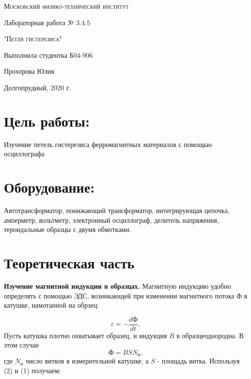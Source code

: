 \documentclass[12pt,a4paper]{article}
\begin{document}
\begin{titlepage}
	\centering
	\vspace{5cm}
	{\scshape\LARGE Московский физико-технический институт \par}
	\vspace{5cm}

	{\huge Лабораторная работа № 3.4.5 \par}
	\vspace{1cm}
	{\scshape\Large "Петля гистерезиса"\par}
	\vspace{2cm}
	\vfill
\begin{flushright}
	{\Large Выполнила студентка Б04-906}\par
	\vspace{0.3cm}
	{\LARGE Прохорова Юлия} \par

	
\end{flushright}
	

	\vfill\large

	Долгопрудный, 2020 г.
\end{titlepage}

\section{Цель работы:}
Изучение петель гистерезиса ферромагнитных материалов с помощью осциллографа

\section{Оборудование:}
Автотрансформатор, понижающий трансформатор, интегрирующая цепочка, амперметр, вольтметр,
электронный осциллограф, делитель напряжения, тероидальные образцы с двумя обмотками.

\section{Теоретическая часть}
\textbf{Изучение магнитной индукции в образцах.} Магнитную индукцию удобно определять с помощью ЭДС, возникающей при изменении магнитного 
потока $\text{Ф}$ в катушке, намотанной на обрзец:

\begin{equation}
    \varepsilon = -\frac{dФ}{dt}, \label{eq:ref}
\end{equation}
Пусть катушка плотно охватывает образец, и индукция \textbf{ $B$ }  в образцеоднородна. В этом случае
\begin{equation}
    \text{Ф} = BSN_и, \label{eq:ref}
\end{equation}
где $N_\text{и}$ число витков в измерительной катушке, а $S$ - площадь витка. Используя (2) и (1) получаем:
\end{document}

